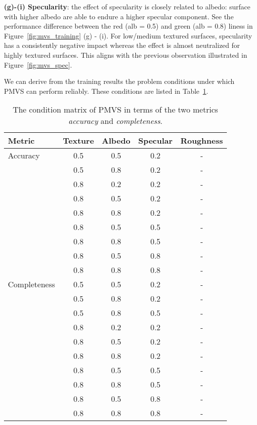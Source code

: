 \noindent\textbf{(g)-(i) Specularity}: the effect of specularity is closely related to albedo: surface with higher albedo are able to endure a higher specular component. See the performance difference between the red (alb = 0.5) and green (alb = 0.8) liness in Figure~\ref{fig:mvs_training} (g) - (i). For low/medium textured surfaces, specularity has a consistently negative impact whereas the effect is almost neutralized for highly textured surfaces. This aligns with the previous observation illustrated in Figure~\ref{fig:mvs_spec}.

We can derive from the training results the problem conditions under which PMVS can perform reliably. These conditions are listed in Table~\ref{tab:mvs_training_result}.
\begin{table}[!htbp]
  \centering
  \begin{tabular}{l*{4}{c}}
  \hline
  \textbf{Metric} & Texture & Albedo & Specular & Roughness\\
  \hline
  Accuracy & 0.5 & 0.5 & 0.2 & -\\
           & 0.5 & 0.8 & 0.2 & -\\
           & 0.8 & 0.2 & 0.2 & -\\
           & 0.8 & 0.5 & 0.2 & -\\
           & 0.8 & 0.8 & 0.2 & -\\
           & 0.8 & 0.5 & 0.5 & -\\
           & 0.8 & 0.8 & 0.5 & -\\
           & 0.8 & 0.5 & 0.8 & -\\
           & 0.8 & 0.8 & 0.8 & -\\
  \hline
  Completeness & 0.5 & 0.5 & 0.2 & -\\
               & 0.5 & 0.8 & 0.2 & -\\
               & 0.5 & 0.8 & 0.5 & -\\
               & 0.8 & 0.2 & 0.2 & -\\
               & 0.8 & 0.5 & 0.2 & -\\
               & 0.8 & 0.8 & 0.2 & -\\
               & 0.8 & 0.5 & 0.5 & -\\
               & 0.8 & 0.8 & 0.5 & -\\
               & 0.8 & 0.5 & 0.8 & -\\
               & 0.8 & 0.8 & 0.8 & -\\
  \hline
  \end{tabular}
  \caption{The condition matrix of PMVS in terms of the two metrics \textit{accuracy} and \textit{completeness}.}
  \label{tab:mvs_training_result}
\end{table}

